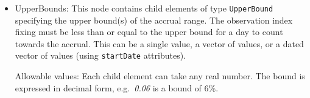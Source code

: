 \begin{itemize}
  Allowable values: Each child element can take any real number. The bound is expressed in decimal form, e.g.\
  \emph{0.02} is a bound of 2\%.

\item UpperBounds: This node contains child elements of type \lstinline!UpperBound! specifying the upper bound(s) of
  the accrual range. The observation index fixing must be less than or equal to the upper bound for a day to count
  towards the accrual. This can be a single value, a vector of values, or a dated vector of values (using
  \lstinline!startDate! attributes).

  Allowable values: Each child element can take any real number. The bound is expressed in decimal form, e.g.\
  \emph{0.06} is a bound of 6\%.

\end{itemize}
